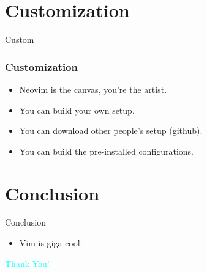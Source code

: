 \documentclass{beamer}
\begin{document}
\section{Customization}
\begin{frame}{Custom}
    \frametitle{Customization}
    \begin{itemize}
        \item Neovim is the canvas, you're the artist.
        \item You can build your own setup.
        \item You can download other people's setup (github).
        \item You can build the pre-installed configurations.
    \end{itemize}
\end{frame}
\section{Conclusion}
\begin{frame}{Conclusion}
    \begin{itemize}
        \item Vim is giga-cool.
    \end{itemize}
\end{frame}

\begin{frame}
    \centering
    {\Huge \textcolor{cyan}{Thank You!}}
\end{frame}
\end{document}
